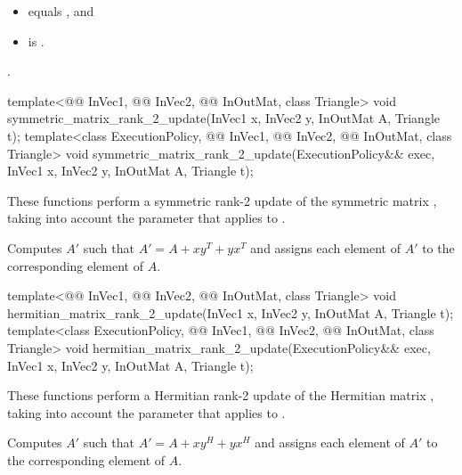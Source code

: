 \pnum
\expects
\begin{itemize}
\item
{} equals , and
\item
{} is .
\end{itemize}

\pnum
\complexity
{}.

\begin{itemdecl}
template<@@ InVec1, @@ InVec2,
         @@ InOutMat, class Triangle>
  void symmetric_matrix_rank_2_update(InVec1 x, InVec2 y, InOutMat A, Triangle t);
template<class ExecutionPolicy, @@ InVec1, @@ InVec2,
         @@ InOutMat, class Triangle>
  void symmetric_matrix_rank_2_update(ExecutionPolicy&& exec,
                                      InVec1 x, InVec2 y, InOutMat A, Triangle t);
\end{itemdecl}

\begin{itemdescr}
\pnum
These functions perform
a symmetric rank-2 update of the symmetric matrix ,
taking into account the  parameter
that applies to .

\pnum
\effects
Computes $A'$ such that $A' = A + x y^T + y x^T$ and
assigns each element of $A'$ to the corresponding element of $A$.
\end{itemdescr}

\begin{itemdecl}
template<@@ InVec1, @@ InVec2,
         @@ InOutMat, class Triangle>
  void hermitian_matrix_rank_2_update(InVec1 x, InVec2 y, InOutMat A, Triangle t);
template<class ExecutionPolicy, @@ InVec1, @@ InVec2,
         @@ InOutMat, class Triangle>
  void hermitian_matrix_rank_2_update(ExecutionPolicy&& exec,
                                      InVec1 x, InVec2 y, InOutMat A, Triangle t);
\end{itemdecl}

\begin{itemdescr}
\pnum
These functions perform
a Hermitian rank-2 update of the Hermitian matrix ,
taking into account the  parameter
that applies to .

\pnum
\effects
Computes $A'$ such that $A' = A + x y^H + y x^H$ and
assigns each element of $A'$ to the corresponding element of $A$.
\end{itemdescr}

